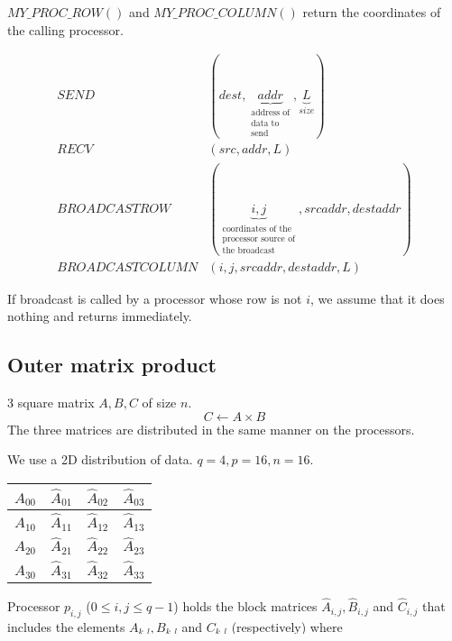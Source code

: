 $MY\_PROC\_ROW()$ and $MY\_PROC\_COLUMN()$ return the coordinates of the calling processor.

\begin{align*}
SEND&(dest, \underbrace{addr}_{\substack{ \text{address of}\\\text{data to}\\\text{send}}}, \underbrace{L}_{size})\\
RECV&(src,addr,L)\\
BROADCASTROW&( \underbrace{i,j}_{\substack{\text{coordinates of the}\\\text{processor source of}\\\text{the broadcast}}},srcaddr, destaddr)\\
BROADCASTCOLUMN&(i,j,srcaddr,destaddr,L)
\end{align*}

If broadcast is called by a processor whose row is not $i$, we assume that it does nothing and returns immediately.

\subsection{Outer matrix product}
3 square matrix $A,B,C$ of size $n$.
\[C\leftarrow A\times B\]
The three matrices are distributed in the same manner on the processors.

We use a 2D distribution of data. $q=4, p=16, n=16$.

\begin{center}
\begin{tabular}{c | c | c | c}
$\hat{A}_{00}$ & $\hat{A}_{01}$ & $\hat{A}_{02}$ & $\hat{A}_{03}$\\
\hline
$\hat{A}_{10}$ & $\hat{A}_{11}$ & $\hat{A}_{12}$ & $\hat{A}_{13}$\\
\hline
$\hat{A}_{20}$ & $\hat{A}_{21}$ & $\hat{A}_{22}$ & $\hat{A}_{23}$\\
\hline
$\hat{A}_{30}$ & $\hat{A}_{31}$ & $\hat{A}_{32}$ & $\hat{A}_{33}$\\
\end{tabular}
\end{center}

Processor $p_{i,j}$ ($0\leq i,j\leq q-1$) holds the block matrices $\hat{A}_{i,j}, \hat{B}_{i,j}$ and $\hat{C}_{i,j}$ that includes the elements $A_{k,l}, B_{k,l}$ and $C_{k,l}$ (respectively) where $i.m\leq k \leq (r-1)m-1$ where $m=\frac{n}{q}$ and $j.m\leq l \leq (j+1)m-1$.

\paragraph{Sequential product:}$\;$

